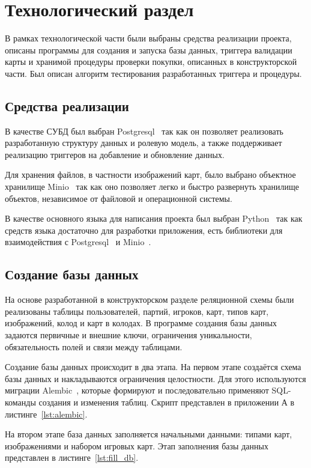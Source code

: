 \chapter{Технологический раздел}
В рамках технологической части были выбраны средства реализации проекта,
описаны программы для создания и запуска базы данных, триггера валидации карты
и
хранимой процедуры проверки покупки, описанных в конструкторской части. Был
описан алгоритм тестирования разработанных триггера и процедуры.

\section{Средства реализации}
В качестве СУБД был выбран Postgresql~\cite{postgres} так как он позволяет
реализовать разработанную структуру данных и ролевую модель, а также
поддерживает реализацию триггеров на добавление и обновление данных.

Для хранения файлов, в частности изображений карт, было выбрано объектное
хранилище Minio~\cite{minio} так как оно позволяет легко и быстро развернуть
хранилище объектов, независимое от файловой и операционной системы.

В качестве основного языка для написания проекта был выбран
Python~\cite{python} так как средств языка достаточно для разработки
приложения, есть библиотеки для взаимодействия с Postgresql~\cite{psycorg2} и
Minio~\cite{minio-python}.

\section{Создание базы данных}

На основе разработанной в конструкторском разделе реляционной схемы были
реализованы таблицы пользователей, партий, игроков, карт, типов карт,
изображений, колод и карт в колодах. В программе создания базы данных задаются
первичные и внешние ключи, ограничения уникальности, обязательность полей и
связи между таблицами.

Создание базы данных происходит в два этапа. На первом этапе создаётся схема
базы данных и накладываются ограничения целостности. Для этого используются
миграции Alembic~\cite{alembic}, которые формируют и последовательно применяют
SQL-команды создания и изменения таблиц. Скрипт представлен в приложении А в
листинге~\ref{lst:alembic}.

На втором этапе база данных заполняется начальными данными: типами карт,
изображениями и набором игровых карт. Этап заполнения базы данных представлен в
листинге~\ref{lst:fill_db}.


